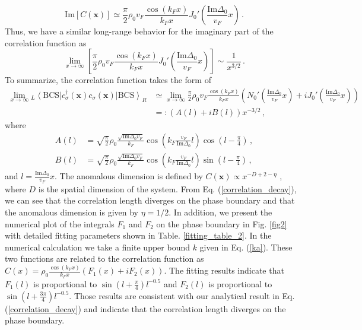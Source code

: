 \documentclass[aps,prl,twocolumn,superscriptaddress]{revtex4-1}
\begin{document}
\begin{bibunit}
\begin{equation}
	\mathrm{Im}[C(\bm{x})]\simeq\frac{\pi}{2} \rho_0 v_F\frac{\cos (k_F x)}{k_Fx} J_0' \left( \frac{\text{Im}
		\Delta_0}{v_F} x \right)\,.
\end{equation}
Thus, we have a similar long-range behavior for the imaginary part of the correlation function as
\begin{equation}
	\lim_{x \rightarrow \infty} \left[  \frac{\pi}{2} \rho_0 v_F \frac{\cos (k_F x)}{k_Fx}
	J_0' \left( \frac{\text{Im} \Delta_0}{v_F} x \right) \right] \sim \frac{1}{x^{3 / 2}}\,.
	\label{Imexact}
\end{equation}
To summarize, the correlation function takes the form of
\begin{align}
	\lim_{x\rightarrow\infty}{}_L \left\langle\text{BCS} \right| c_{\sigma}^{\dagger}(\bm{x}) c_{\sigma}(\bm{x}) \left| \text{BCS}
	\right\rangle_R&\simeq \lim_{x\rightarrow\infty}\frac{\pi}{2} \rho_0 v_F \frac{\cos (k_F x)}{k_Fx}( N_0' ( \frac{\text{Im}\Delta_0}{v_F} x )+iJ_0'( \frac{\text{Im}\Delta_0}{v_F} x ))\nonumber\\
	&=:(A(l)+iB(l))x^{-3/2}\,,
	\label{correlation_decay}
\end{align}
where
\begin{align}
	A(l)&=\sqrt{\frac{\pi}{2}}\rho_0 \frac{\sqrt{\text{Im}\Delta_0 v_F}}{k_F} \cos (k_F \frac{v_F}{\text{Im}\Delta_0}l)\cos(l-\frac{\pi}{4})\,,\nonumber\\
	B(l)&=\sqrt{\frac{\pi}{2}}\rho_0 \frac{\sqrt{\text{Im}\Delta_0 v_F}}{k_F} \cos (k_F \frac{v_F}{\text{Im}\Delta_0}l)\sin(l-\frac{\pi}{4})\,,
\end{align}
and $l= \frac{\text{Im}\Delta_0}{v_F} x$. The anomalous dimension is defined by $C(\bm{x})\propto x^{-D+2-\eta}$ \cite{Sachdev:2011uj}, where $D$ is the spatial dimension of the system. From Eq. (\ref{correlation_decay}), we can see that the correlation length diverges on the phase boundary and that the anomalous dimension is given by $\eta=1/2$. In addition, we present the numerical plot of the integrals $F_1$ and $F_2$ on the phase boundary in Fig. \ref{fig2} with detailed fitting parameters shown in Table. \ref{fitting_table_2}. In the numerical calculation we take a finite upper bound $k$ given in Eq. (\ref{ka}). These two functions are related to the correlation function as $C(x)=\rho_0 \frac{\cos (k_F x)}{k_Fx}(F_1(x)+iF_2(x))$. %
The fitting results indicate that $F_1(l)$ is proportional to $\sin(l+\frac{\pi}{4})l^{-0.5}$ and $F_2(l)$ is proportional to $\sin(l+\frac{3\pi}{4})l^{-0.5}$. Those results are consistent with our analytical result in Eq. (\ref{correlation_decay}) and indicate that the correlation length diverges on the phase boundary.


\end{bibunit}
\end{document}
